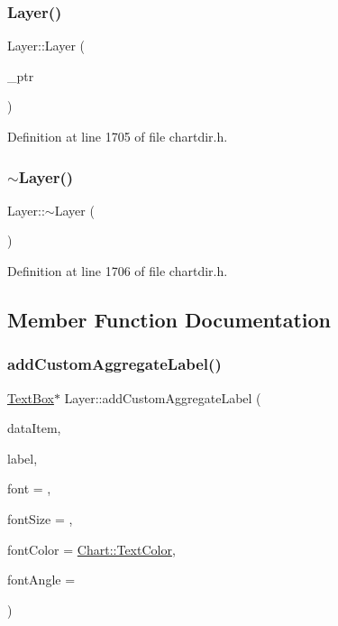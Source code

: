 \subsubsection{\texorpdfstring{Layer()}{Layer()}}
{\footnotesize\ttfamily Layer\+::\+Layer (\begin{DoxyParamCaption}\item[{Layer\+Internal $\ast$}]{\+\_\+ptr }\end{DoxyParamCaption})\hspace{0.3cm}{\ttfamily [inline]}}



Definition at line 1705 of file chartdir.\+h.

\mbox{\label{class_layer_a1b1ba4804451dfe6cc357194e42762ae}} 
\subsubsection{\texorpdfstring{$\sim$\+Layer()}{~Layer()}}
{\footnotesize\ttfamily Layer\+::$\sim$\+Layer (\begin{DoxyParamCaption}{ }\end{DoxyParamCaption})\hspace{0.3cm}{\ttfamily [inline]}}



Definition at line 1706 of file chartdir.\+h.



\subsection{Member Function Documentation}
\mbox{\label{class_layer_a976d43d07961d45ecc945fdcbeba0e66}} 
\subsubsection{\texorpdfstring{add\+Custom\+Aggregate\+Label()}{addCustomAggregateLabel()}}
{\footnotesize\ttfamily \hyperlink{class_text_box}{Text\+Box}$\ast$ Layer\+::add\+Custom\+Aggregate\+Label (\begin{DoxyParamCaption}\item[{int}]{data\+Item,  }\item[{const char $\ast$}]{label,  }\item[{const char $\ast$}]{font = {},  }\item[{double}]{font\+Size = {},  }\item[{int}]{font\+Color = {\ttfamily \hyperlink{namespace_chart_abee0d882fdc9ad0b001245ad9fc64011a879e14f2f5024caccc047374342321ef}{Chart\+::\+Text\+Color}},  }\item[{double}]{font\+Angle = {} }\end{DoxyParamCaption})\hspace{0.3cm}{\ttfamily [inline]}}



